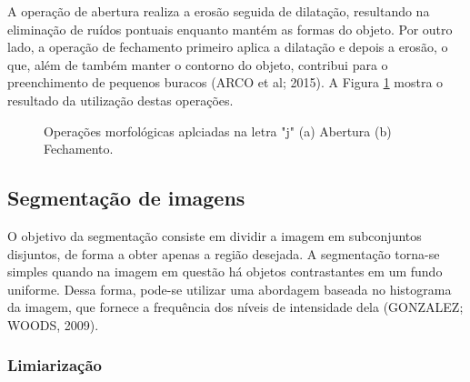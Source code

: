 A operação de abertura realiza a erosão seguida de dilatação, resultando na eliminação de ruídos pontuais enquanto mantém as formas do objeto. Por outro lado, a operação de fechamento primeiro aplica a dilatação e depois a erosão, o que, além de também manter o contorno do objeto, contribui para o preenchimento de pequenos buracos (ARCO et al; 2015). A Figura \ref{img:morph_op} mostra o resultado da utilização destas operações. 

\begin{figure}[H]
\centering
    \caption{\label{img:morph_op} Operações morfológicas aplciadas na letra "j" (a) Abertura (b) Fechamento.}
\end{figure}

\subsection{Segmentação de imagens}

O objetivo da segmentação consiste em dividir a imagem em subconjuntos disjuntos, de forma a obter apenas a região desejada. A segmentação torna-se simples quando na imagem em questão há objetos contrastantes em um fundo uniforme. Dessa forma, pode-se utilizar uma abordagem baseada no histograma da imagem, que fornece a frequência dos níveis de intensidade dela (GONZALEZ; WOODS, 2009).

\subsubsection{Limiarização}

